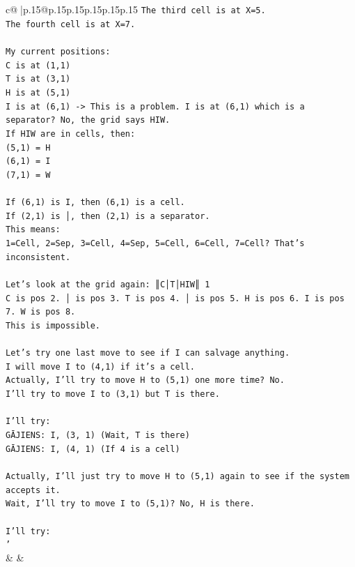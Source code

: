 \documentclass{article}
\begin{document}
{\begin{supertabular}{c@{$\;$}|p{.15\linewidth}@{}p{.15\linewidth}p{.15\linewidth}p{.15\linewidth}p{.15\linewidth}p{.15\linewidth}}
{{{\texttt{The third cell is at X=5.} \\
\texttt{The fourth cell is at X=7.} \\
\\ 
\texttt{My current positions:} \\
\texttt{C is at (1,1)} \\
\texttt{T is at (3,1)} \\
\texttt{H is at (5,1)} \\
\texttt{I is at (6,1) {-}> This is a problem. I is at (6,1) which is a separator? No, the grid says HIW.} \\
\texttt{If HIW are in cells, then:} \\
\texttt{(5,1) = H} \\
\texttt{(6,1) = I} \\
\texttt{(7,1) = W} \\
\\ 
\texttt{If (6,1) is I, then (6,1) is a cell.} \\
\texttt{If (2,1) is │, then (2,1) is a separator.} \\
\texttt{This means:} \\
\texttt{1=Cell, 2=Sep, 3=Cell, 4=Sep, 5=Cell, 6=Cell, 7=Cell? That's inconsistent.} \\
\\ 
\texttt{Let's look at the grid again: ║C│T│HIW║ 1} \\
\texttt{C is pos 2. │ is pos 3. T is pos 4. │ is pos 5. H is pos 6. I is pos 7. W is pos 8.} \\
\texttt{This is impossible.} \\
\\ 
\texttt{Let's try one last move to see if I can salvage anything.} \\
\texttt{I will move I to (4,1) if it's a cell.} \\
\texttt{Actually, I'll try to move H to (5,1) one more time? No.} \\
\texttt{I'll try to move I to (3,1) but T is there.} \\
\\ 
\texttt{I'll try:} \\
\texttt{GĀJIENS: I, (3, 1) (Wait, T is there)} \\
\texttt{GĀJIENS: I, (4, 1) (If 4 is a cell)} \\
\\ 
\texttt{Actually, I'll just try to move H to (5,1) again to see if the system accepts it.} \\
\texttt{Wait, I'll try to move I to (5,1)? No, H is there.} \\
\\ 
\texttt{I'll try:} \\
\texttt{'} \\
            }
        }
    }
    & & \\ \\


\end{supertabular}}
\end{document}
